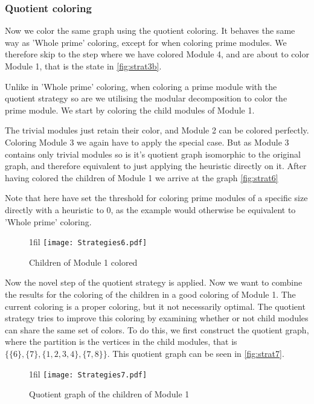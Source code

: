 \documentclass[a4paper]{article}
\makeatletter
\newcommand*{\centerfloat}{%
  \parindent \z@
  \leftskip \z@ \@plus 1fil \@minus \textwidth
  \rightskip\leftskip
  \parfillskip \z@skip}
\makeatother
\begin{document}
\subsubsection{Quotient coloring}
Now we color the same graph using the quotient coloring. It behaves the same way
as 'Whole prime' coloring, except for when coloring prime modules. We therefore
skip to the step where we have colored Module 4, and are about to color 
Module 1, that is the state in \autoref{fig:strat3b}.

Unlike in 'Whole prime' coloring, when coloring a prime module with the quotient
strategy so are we utilising the modular decomposition to color the prime
module. We start by coloring the child modules of Module 1.

The trivial modules just retain their color, and Module 2 can be colored
perfectly. Coloring Module 3 we again have to apply the special case. But as
Module 3 contains only trivial modules so is it's quotient graph isomorphic to
the original graph, and therefore equivalent to just applying the heuristic
directly on it. After having colored the children of Module 1 we arrive at the
graph \autoref{fig:strat6}

Note that here have set the threshold for coloring prime modules of a specific size
directly with a heuristic to 0, as the example would otherwise be equivalent to
'Whole prime' coloring. 

\begin{figure}[H]
    \centerfloat
    \texttt{[image: Strategies6.pdf]}
    \caption{Children of Module 1 colored}
    \label{fig:strat6}
\end{figure}

Now the novel step of the quotient strategy is applied. Now we want to combine
the results for the coloring of the children in a good coloring of Module 1. The
current coloring is a proper coloring, but it not necessarily optimal. The
quotient strategy tries to improve this coloring by examining whether or not
child modules can share the same set of colors. To do this, we first construct
the quotient graph, where the partition is the vertices in the child modules, 
that is $\{\{6\},\{7\},\{1,2,3,4\},\{7,8\}\}$. This quotient graph can be seen
in \autoref{fig:strat7}.

\begin{figure}[H]
    \centerfloat
    \texttt{[image: Strategies7.pdf]}
    \caption{Quotient graph of the children of Module 1}
    \label{fig:strat7}
\end{figure}
\end{document}
